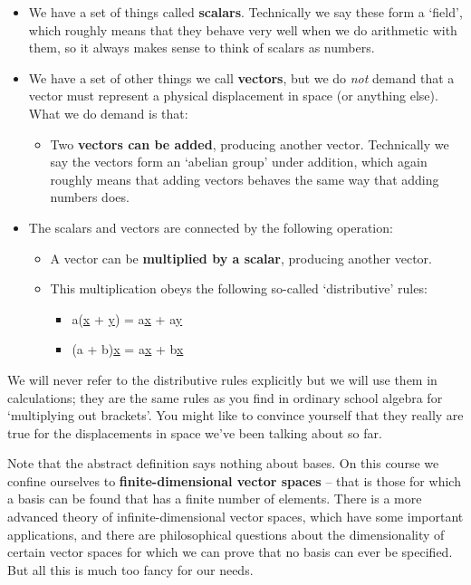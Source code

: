 \documentclass[oneside,english]{amsbook}
\numberwithin{section}{chapter}
\theoremstyle{plain}
\theoremstyle{definition}
\begin{document}
\begin{itemize}
	\item
	We have a set of things called \textbf{scalars}. Technically we say
	these form a `field', which roughly means that they behave very well
	when we do arithmetic with them, so it always makes sense to think of
	scalars as numbers.
	\item
	We have a set of other things we call \textbf{vectors}, but we do
	\emph{not} demand that a vector must represent a physical displacement
	in space (or anything else). What we do demand is that:
	
	\begin{itemize}
		\item
		Two \textbf{vectors can be added}, producing another vector.
		Technically we say the vectors form an `abelian group' under
		addition, which again roughly means that adding vectors behaves the
		same way that adding numbers does.
	\end{itemize}
	\item
	The scalars and vectors are connected by the following operation:
	
	\begin{itemize}
		\item
		A vector can be \textbf{multiplied by a scalar}, producing another
		vector.
		\item
		This multiplication obeys the following so-called `distributive'
		rules:
		
		\begin{itemize}
			\item
			a(\ul{x} + \ul{y}) = a\ul{x} + a\ul{y}
			\item
			(a + b)\ul{x} = a\ul{x} + b\ul{x}
		\end{itemize}
	\end{itemize}
\end{itemize}

We will never refer to the distributive rules explicitly but we will use
them in calculations; they are the same rules as you find in ordinary
school algebra for `multiplying out brackets'. You might like to
convince yourself that they really are true for the displacements in
space we've been talking about so far.

Note that the abstract definition says nothing about bases. On this
course we confine ourselves to \textbf{finite-dimensional vector spaces}
-- that is those for which a basis can be found that has a finite number
of elements. There is a more advanced theory of infinite-dimensional
vector spaces, which have some important applications, and there are
philosophical questions about the dimensionality of certain vector
spaces for which we can prove that no basis can ever be specified. But
all this is much too fancy for our needs.
\end{document}
